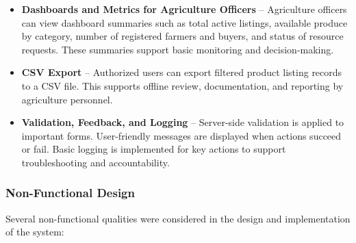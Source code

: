 \begin{itemize}
    \item \textbf{Dashboards and Metrics for Agriculture Officers} -- Agriculture officers can view dashboard summaries such as total active listings, available produce by category, number of registered farmers and buyers, and status of resource requests. These summaries support basic monitoring and decision-making.
    
    \item \textbf{CSV Export} -- Authorized users can export filtered product listing records to a CSV file. This supports offline review, documentation, and reporting by agriculture personnel.
    
    \item \textbf{Validation, Feedback, and Logging} -- Server-side validation is applied to important forms. User-friendly messages are displayed when actions succeed or fail. Basic logging is implemented for key actions to support troubleshooting and accountability.
\end{itemize}

\subsubsection*{Non-Functional Design}

Several non-functional qualities were considered in the design and implementation of the system:

